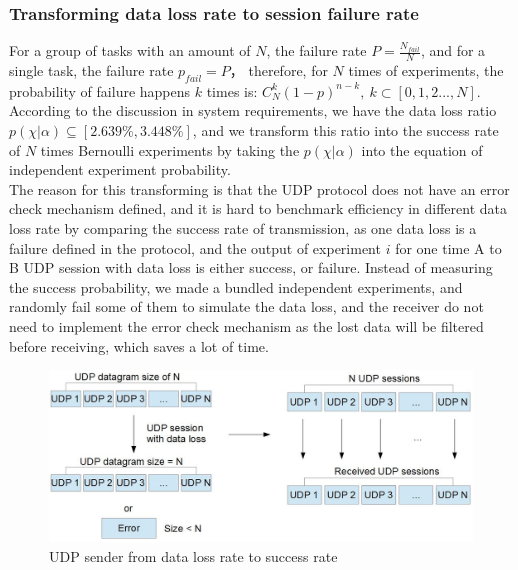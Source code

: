\documentclass[11pt,openright,a4paper]{report}
\begin{document}
\subsubsection{Transforming data loss rate to session failure rate}
For a group of tasks with an amount of $N$, the failure rate $P=\frac{N_{fail}}{N}$, and for a single task, the failure rate $p_{fail}=P$， therefore, for $N$ times of experiments, the probability of failure happens $k$ times is: $C_{N}^{k}(1-p)^{n-k},\ k \subset [0,1,2...,N]$. According to the discussion in system requirements, we have the data loss ratio $p(\chi | \alpha) \subseteq [2.639\%, 3.448\%] $, and we transform this ratio into the success rate of $N$ times Bernoulli experiments by taking the $p(\chi | \alpha)$ into the equation of independent experiment probability.\\
The reason for this transforming is that the UDP protocol does not have an error check mechanism defined, and it is hard to benchmark efficiency in different data loss rate by comparing the success rate of transmission, as one data loss is a failure defined in the protocol, and the output of experiment $i$ for one time A to B UDP session with data loss is either success, or failure. Instead of measuring the success probability, we made a bundled independent experiments, and randomly fail some of them to simulate the data loss, and the receiver do not need to implement the error check mechanism as the lost data will be filtered before receiving, which saves a lot of time.\\
\begin{figure}[H]
\centering
\includegraphics[width=0.8\linewidth]{picture/udpsender}
\caption{UDP sender from data loss rate to success rate}
\label{fig:udpsender}
\end{figure}
\end{document}
